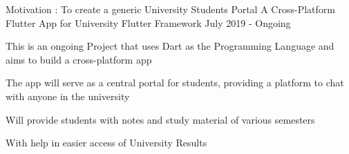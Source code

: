 \begin{cventries}
{\begin{cvitems}
            \end{cvitems}
        }
    \cventry
        {Motivation : To create a generic University Students Portal}
        {A Cross-Platform Flutter App for University}
        {Flutter Framework}
        {July 2019 - Ongoing}
            {
            \begin{cvitems}
                \item {This is an ongoing Project that uses Dart as the Programming Language and aims to build a cross-platform app}
                \item {The app will serve as a central portal for students, providing a platform to chat with anyone in the university}
                \item {Will provide students with notes and study material of various semesters}
                \item {With help in easier access of University Results}
        \end{cvitems}
        }
\end{cventries}